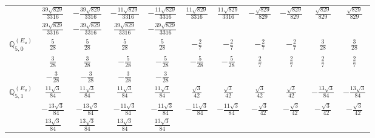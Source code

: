 \documentclass[fleqn,10pt,landscape]{article}
\begin{document}
\begin{itemize}
{\begin{center}
\begin{longtable}{ccccccccccc}
& $ \frac{39 \sqrt{829}}{3316} $ & $ - \frac{39 \sqrt{829}}{3316} $ & $ - \frac{11 \sqrt{829}}{3316} $ & $ - \frac{11 \sqrt{829}}{3316} $ & $ \frac{11 \sqrt{829}}{3316} $ & $ \frac{11 \sqrt{829}}{3316} $ & $ - \frac{\sqrt{829}}{829} $ & $ - \frac{\sqrt{829}}{829} $ & $ \frac{\sqrt{829}}{829} $ & $ \frac{\sqrt{829}}{829} $ \\
& $ \frac{39 \sqrt{829}}{3316} $ & $ - \frac{39 \sqrt{829}}{3316} $ & $ \frac{39 \sqrt{829}}{3316} $ & $ - \frac{39 \sqrt{829}}{3316} $ & $  $ & $  $ & $  $ & $  $ & $  $ & $  $ \\ \hline
$\mathbb{Q}_{5,0}^{(E_{u})}$ & $ \frac{5}{28} $ & $ \frac{5}{28} $ & $ \frac{5}{28} $ & $ \frac{5}{28} $ & $ - \frac{2}{7} $ & $ - \frac{2}{7} $ & $ - \frac{2}{7} $ & $ - \frac{2}{7} $ & $ \frac{3}{28} $ & $ \frac{3}{28} $ \\
& $ \frac{3}{28} $ & $ \frac{3}{28} $ & $ - \frac{5}{28} $ & $ - \frac{5}{28} $ & $ - \frac{5}{28} $ & $ - \frac{5}{28} $ & $ \frac{2}{7} $ & $ \frac{2}{7} $ & $ \frac{2}{7} $ & $ \frac{2}{7} $ \\
& $ - \frac{3}{28} $ & $ - \frac{3}{28} $ & $ - \frac{3}{28} $ & $ - \frac{3}{28} $ & $  $ & $  $ & $  $ & $  $ & $  $ & $  $ \\ \hline
$\mathbb{Q}_{5,1}^{(E_{u})}$ & $ \frac{11 \sqrt{3}}{84} $ & $ \frac{11 \sqrt{3}}{84} $ & $ \frac{11 \sqrt{3}}{84} $ & $ \frac{11 \sqrt{3}}{84} $ & $ \frac{\sqrt{3}}{42} $ & $ \frac{\sqrt{3}}{42} $ & $ \frac{\sqrt{3}}{42} $ & $ \frac{\sqrt{3}}{42} $ & $ - \frac{13 \sqrt{3}}{84} $ & $ - \frac{13 \sqrt{3}}{84} $ \\
& $ - \frac{13 \sqrt{3}}{84} $ & $ - \frac{13 \sqrt{3}}{84} $ & $ - \frac{11 \sqrt{3}}{84} $ & $ - \frac{11 \sqrt{3}}{84} $ & $ - \frac{11 \sqrt{3}}{84} $ & $ - \frac{11 \sqrt{3}}{84} $ & $ - \frac{\sqrt{3}}{42} $ & $ - \frac{\sqrt{3}}{42} $ & $ - \frac{\sqrt{3}}{42} $ & $ - \frac{\sqrt{3}}{42} $ \\
& $ \frac{13 \sqrt{3}}{84} $ & $ \frac{13 \sqrt{3}}{84} $ & $ \frac{13 \sqrt{3}}{84} $ & $ \frac{13 \sqrt{3}}{84} $ & $  $ & $  $ & $  $ & $  $ & $  $ & $  $ \\
\end{longtable}
\end{center}
}
\end{itemize}
\end{document}
